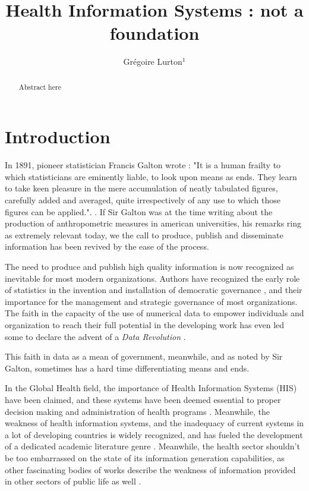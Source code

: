 \documentclass[letterpaper, 10 pt, conference]{IEEEconf}  %
\title{\LARGE \bf
Health Information Systems : not a foundation
}
\author{Grégoire Lurton$^{1}$ %
}
\begin{document}
\maketitle
\thispagestyle{empty}
\pagestyle{empty}


\begin{abstract}

	Abstract here

\end{abstract}


\section{Introduction}

In 1891, pioneer statistician Francis Galton wrote : "It is a human frailty to which statisticians are eminently liable, to look upon means as ends. They learn to take keen pleasure in the mere accumulation of neatly tabulated figures, carefully added and averaged, quite irrespectively of any use to which those figures can be applied.". \cite{galton_useful_1891}. If Sir Galton was at the time writing about the production of anthropometric measures in american universities, his remarks ring as extremely relevant today, we the call to produce, publish and disseminate information has been revived by the ease of the process.

The need to produce and publish high quality information is now recognized as inevitable for most modern organizations. Authors have recognized the early role of statistics in the invention and installation of democratic governance \cite{porter_trust_1996}, and their importance for the management and strategic governance of most organizations. The faith in the capacity of the use of numerical data to empower individuals and organization to reach their full potential in the developing work has even led some to declare the advent of a \textit{Data Revolution} \cite{independent_expert_group_on_a_data_revolution_for_sustainable_development_world_2014, center_for_global_development_delivering_2014}.

This faith in data as a mean of government, meanwhile, and as noted by Sir Galton, sometimes has a hard time differentiating means and ends.

In the Global Health field, the importance of Health Information Systems (HIS) have been claimed, and these systems have been deemed essential to proper decision making and administration of health programs \cite{abou-zahr_health_2005}. Meanwhile, the weakness of health information systems, and the inadequacy of current systems in a lot of  developing countries is widely recognized, and has fueled the development of a dedicated academic literature genre \cite{abou-zahr_better_2010} \cite{kiberu_strengthening_2014}. Meanwhile, the health sector shouldn't be too embarrassed on the state of its information generation capabilities, as other fascinating bodies of works describe the weakness of information provided in other sectors of public life as well \cite{jerven_poor_2013}.
\end{document}
